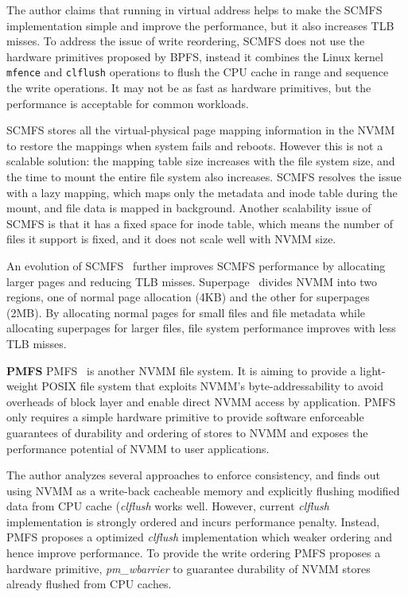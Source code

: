 The author claims that running in virtual address helps to make the SCMFS
implementation simple and improve the performance, but it also increases
TLB misses. To address the issue of write reordering, SCMFS does not use the
hardware primitives proposed by BPFS, instead it combines the Linux kernel
\texttt{mfence} and \texttt{clflush} operations to flush the CPU cache in
range and sequence the write operations. It may not be as fast as hardware
primitives, but the performance is acceptable for common workloads.

SCMFS stores all the virtual-physical page mapping information in the NVMM
to restore the mappings when system fails and reboots. However this is not
a scalable solution: the mapping table size increases with the file system
size, and the time to mount the entire file system also increases. SCMFS
resolves the issue with a lazy mapping, which maps only the metadata and inode
table during the mount, and file data is mapped in background.
Another scalability issue of SCMFS is that it has a fixed space for inode table,
which means the number of files it support is fixed, and it does not scale
well with NVMM size.

An evolution of SCMFS~\cite{superpage} further improves SCMFS performance
by allocating larger pages and reducing TLB misses. Superpage~\cite{superpage}
divides NVMM into two regions, one of normal page allocation (4KB) and the other
for superpages (2MB). By allocating normal pages for small files and file 
metadata while allocating superpages for larger files, file system performance
improves with less TLB misses.


\textbf{PMFS} PMFS~\cite{PMFS} is another NVMM file system. It is aiming to
provide a
light-weight POSIX file system that exploits NVMM's byte-addressability to
avoid overheads of block layer and enable direct NVMM access by application.
PMFS only requires a simple hardware primitive to provide software enforceable
guarantees of durability and ordering of stores to NVMM and exposes the 
performance potential of NVMM to user applications.

The author analyzes several approaches to enforce consistency, and finds out
using NVMM as a write-back cacheable memory and explicitly flushing modified
data from CPU cache (\emph{clflush} works well. However, current \emph{clflush}
implementation is strongly ordered and incurs performance penalty. Instead,
PMFS proposes a optimized \emph{clflush} implementation which weaker ordering
and hence improve performance. To provide the write ordering PMFS proposes
a hardware primitive, \emph{pm\_wbarrier} to guarantee durability of NVMM stores
already flushed from CPU caches.

